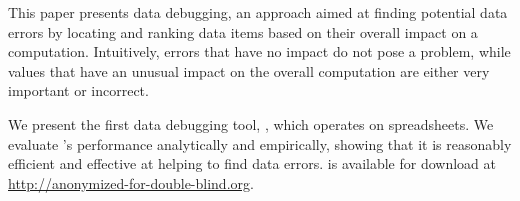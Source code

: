 This paper presents data debugging, an approach aimed at
finding potential data errors by locating and ranking data items based on their
overall impact on a computation. Intuitively, errors that have no
impact do not pose a problem, while values that have an unusual impact
on the overall computation are either very important or incorrect.

We present the first data debugging
tool, \checkcell{}, which operates on spreadsheets. We evaluate
\checkcell{}'s performance analytically and empirically, showing that
it is reasonably efficient and effective at helping to find data
errors. \checkcell{} is available for download at
\url{http://anonymized-for-double-blind.org}.


